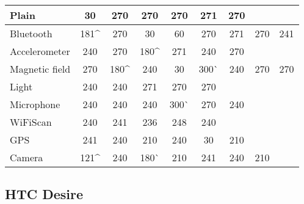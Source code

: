 \begin{table}[H]
	\centering
    \begin{tabular}{| l | c | c | c | c | c | c | c | c | }
    \hline
    Plain          & \cellcolor{red!25}30  & 270  & 270   & 270   & 271       & 270 & ~      & ~   \\ \hline
    Bluetooth      & 181\^ & 270  & \cellcolor{red!25}30   & \cellcolor{red!25}60   & 270       & 271 & 270      & 241 \\ \hline
    Accelerometer  & 240  & 270  & 180\^ & 271   & 240       & 270 & ~      & ~  \\ \hline
    Magnetic field & 270  & 180\^ & 240   & \cellcolor{red!25}30   & 300^^   & 240 & 270      & 270 \\ \hline
    Light          & 240  & 240  & 271   & 270   & 270       & ~ & ~        & ~   \\ \hline
    Microphone     & 240  & 240  & 240   & 300^^ & 270       & 240 & ~     & ~   \\ \hline
    WiFiScan       & 240  & 241  & 236   & 248 & 240 & ~  & ~   \\ \hline
    GPS            & 241  & 240  & 210 & 240 & \cellcolor{red!25}30 & 210  \\ \hline
    Camera         & 121\^ & 240  & 180^^ & 210   & 241       & 240 & 210      & ~  \\ \hline
    \end{tabular}
\end{table}



\subsection{HTC Desire}	

